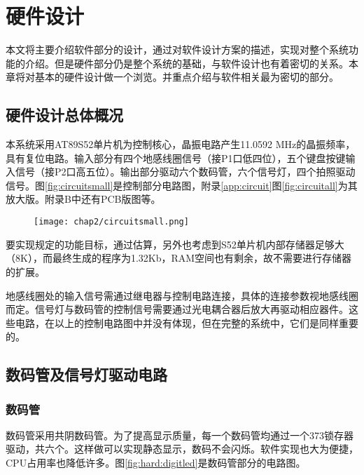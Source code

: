 

\chapter{硬件设计}
\label{chap:hardware}
	本文将主要介绍软件部分的设计，通过对软件设计方案的描述，实现对整个系统功能的介绍。但是硬件部分仍是整个系统的基础，与软件设计也有着密切的关系。本章将对基本的硬件设计做一个浏览。并重点介绍与软件相关最为密切的部分。
\section{硬件设计总体概况}
	本系统采用AT89S52单片机为控制核心，晶振电路产生11.0592 MHz的晶振频率，具有复位电路。输入部分有四个地感线圈信号（接P1口低四位），五个键盘按键输入信号（接P2口高五位）。输出部分驱动六个数码管，六个信号灯，四个拍照驱动信号。图\ref{fig:circuitsmall}是控制部分电路图，附录\ref{app:circuit}图\ref{fig:circuitall}为其放大版。附录B中还有PCB版图等。
	
\begin{figure}[!tbh]
  \centering
  \texttt{[image: chap2/circuitsmall.png]}
\end{figure}
	要实现规定的功能目标，通过估算，另外也考虑到S52单片机内部存储器足够大（8K），而最终生成的程序为1.32Kb，RAM空间也有剩余，故不需要进行存储器的扩展。
	
	地感线圈处的输入信号需通过继电器与控制电路连接，具体的连接参数视地感线圈而定。信号灯与数码管的控制信号需要通过光电耦合器后放大再驱动相应器件。这些电路，在以上的控制电路图中并没有体现，但在完整的系统中，它们是同样重要的。
	
\section{数码管及信号灯驱动电路}
	
	\subsection{数码管}
	数码管采用共阴数码管。为了提高显示质量，每一个数码管均通过一个373锁存器驱动，共六个。这样做可以实现静态显示，数码不会闪烁。软件实现也大为便捷，CPU占用率也降低许多。图\ref{fig:hard:digitled}是数码管部分的电路图。
	
